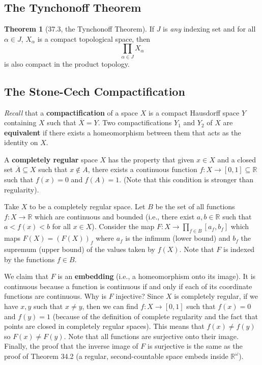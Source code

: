 \documentclass{article}
\newcommand{\nline}{\vspace*{0.5\baselineskip}}
\theoremstyle{definition}
\newtheorem{theorem}{Theorem}[subsection]
\begin{document}
\begin{flushleft}
\subsection{The Tynchonoff Theorem}

\begin{theorem}[37.3, the Tynchonoff Theorem]
If $J$ is \textit{any} indexing set and for all $\alpha \in J$, $X_\alpha$ is a compact topological space, then
\[
\prod_{\alpha \in J} X_\alpha
\]
is also compact in the product topology.
\end{theorem}

\subsection{The Stone-Cech Compactification}

\textit{Recall} that a \textbf{compactification} of a space $X$ is a compact Hausdorff space $Y$ containing $X$ such that $\overline{X} = Y$. Two compactifications $Y_1$ and $Y_2$ of $X$ are \textbf{equivalent} if there exists a homeomorphism between them that acts as the identity on $X$.

\nline

A \textbf{completely regular} space $X$ has the property that given $x \in X$ and a closed set $\overline{A} \subseteq X$ such that $x \notin A$, there exists a continuous function $f : X \to [0,1] \subseteq \mathbb{R}$ such that $f(x) = 0$ and $f(A) = 1$. (Note that this condition is stronger than regularity).

\nline

Take $X$ to be a completely regular space. Let $B$ be the set of all functions $f : X \to \mathbb{R}$ which are continuous and bounded (i.e., there exist $a, b \in \mathbb{R}$ such that $a < f(x) < b$ for all $x \in X$). Consider the map $F : X \to \prod_{f \in B} [a_f, b_f]$ which maps $F(X) = (F(X))_f$ where $a_f$ is the infimum (lower bound) and $b_f$ the supremum (upper bound) of the values taken by $f(X)$. Note that $F$ is indexed by the functions $f \in B$.

\nline

We claim that $F$ is an \textbf{embedding} (i.e., a homeomorphism onto its image). It is continuous because a function is continuous if and only if each of its coordinate functions are continuous. Why is $F$ injective? Since $X$ is completely regular, if we have $x,y$ such that $x \neq y$, then we can find $f : X \to [0,1]$ such that $f(x) = 0$ and $f(y) = 1$ (because of the definition of complete regularity and the fact that points are closed in completely regular spaces). This means that $f(x) \neq f(y)$ so $F(x) \neq F(y)$. Note that all functions are surjective onto their image. Finally, the proof that the inverse image of $F$ is surjective is the same as the proof of Theorem 34.2 (a regular, second-countable space embeds inside $\mathbb{R}^\omega$).


\end{flushleft}
\end{document}
